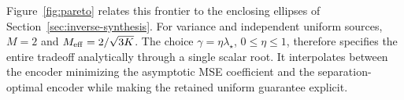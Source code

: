 Figure~\ref{fig:pareto} relates this frontier to the enclosing ellipses of Section~\ref{sec:inverse-synthesis}. For variance and independent uniform sources, $M=2$ and $M_{\rm eff}=2/\sqrt{3K}$. The choice $\gamma=\eta\lambda_\star$, $0\le\eta\le1$, therefore specifies the entire tradeoff analytically through a single scalar root. It interpolates between the encoder minimizing the asymptotic MSE coefficient and the separation-optimal encoder while making the retained uniform guarantee explicit.

